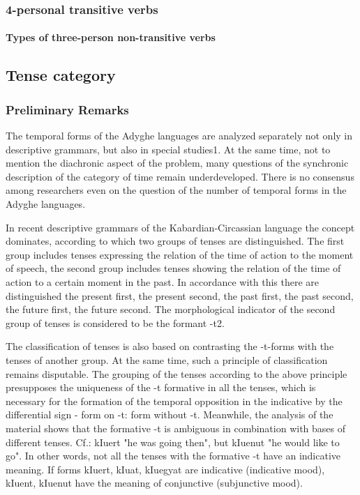 \documentclass[a4paper,12pt]{book}
\newcommand{\1}[1]{\textbf{\emph{#1}}} %
\newcommand{\2}[1]{\textbf{[#1]}} %
\newcommand{\3}[1]{\fontsize{11pt}{0cm}\textbf{\emph{#1}}} %
\newcommand{\4}[1]{\fontsize{10pt}{0cm}\emph{#1}}	%
\newcommand{\5}[1]{\textbf{/#1/}} %
\newcommand{\6}[1]{\textbf{[#1]}} %
\newcommand{\7}[1]{\fontsize{12pt}{0cm}\emph{#1}} %
\newcommand{\8}[1]{\fontsize{12pt}{0cm}`#1'} %
\newcommand{\9}[1]{\fontsize{12pt}{0cm}(lit. `#1')} %
\begin{document}
\subsubsection{4-personal transitive verbs}
\paragraph{Types of three-person non-transitive verbs}
\subsection{Tense category}
\subsubsection{Preliminary Remarks}
The temporal forms of the Adyghe languages are analyzed separately not only in descriptive grammars, but also in special studies1. At the same time, not to mention the diachronic aspect of the problem, many questions of the synchronic description of the category of time remain underdeveloped. There is no consensus among researchers even on the question of the number of temporal forms in the Adyghe languages.

In recent descriptive grammars of the Kabardian-Circassian language the concept dominates, according to which two groups of tenses are distinguished. The first group includes tenses expressing the relation of the time of action to the moment of speech, the second group includes tenses showing the relation of the time of action to a certain moment in the past. In accordance with this there are distinguished the present first, the present second, the past first, the past second, the future first, the future second. The morphological indicator of the second group of tenses is considered to be the formant -t2.

The classification of tenses is also based on contrasting the -t-forms with the tenses of another group. At the same time, such a principle of classification remains disputable. The grouping of the tenses according to the above principle presupposes the uniqueness of the -t formative in all the tenses, which is necessary for the formation of the temporal opposition in the indicative by the differential sign - form on -t: form without -t. Meanwhile, the analysis of the material shows that the formative -t is ambiguous in combination with bases of different tenses. Cf.: kIuert "he was going then", but kIuenut "he would like to go". In other words, not all the tenses with the formative -t have an indicative meaning. If forms kIuert, kIuat, kIuegyat are indicative (indicative mood), kIuent, kIuenut have the meaning of conjunctive (subjunctive mood).
\end{document}
